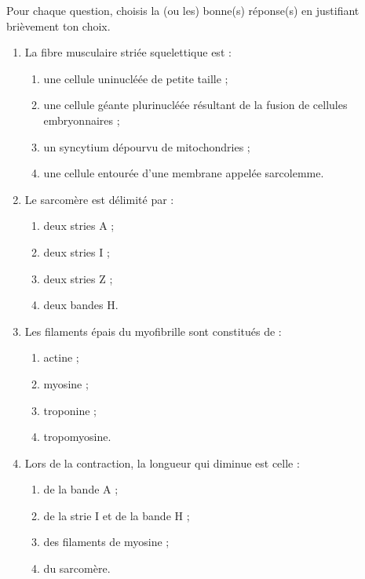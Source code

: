 \documentclass[11pt]{article}
\begin{document}
\begin{exercice}
Pour chaque question, choisis la (ou les) bonne(s) réponse(s) en justifiant brièvement ton choix.
\begin{enumerate}
\item La fibre musculaire striée squelettique est :
\begin{enumerate}
\item une cellule uninucléée de petite taille ;
\item une cellule géante plurinucléée résultant de la fusion de cellules embryonnaires ;
\item un syncytium dépourvu de mitochondries ;
\item une cellule entourée d'une membrane appelée sarcolemme.
\end{enumerate}
\item Le sarcomère est délimité par :
\begin{enumerate}
\item deux stries A ; \item deux stries I ; \item deux stries Z ; \item deux bandes H.
\end{enumerate}
\item Les filaments épais du myofibrille sont constitués de :
\begin{enumerate}
\item actine ; \item myosine ; \item troponine ; \item tropomyosine.
\end{enumerate}
\item Lors de la contraction, la longueur qui diminue est celle :
\begin{enumerate}
\item de la bande A ; \item de la strie I et de la bande H ; \item des filaments de myosine ; \item du sarcomère.
\end{enumerate}
\end{enumerate}
\end{exercice}
\end{document}
